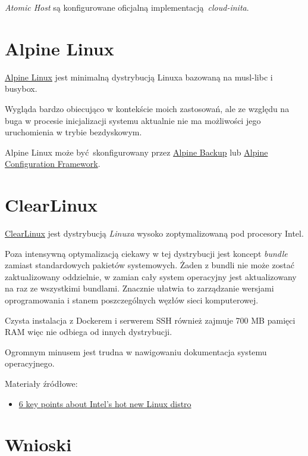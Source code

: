 \documentclass[a4paper,12pt,twoside,openany]{report}
\providecommand{\tightlist}{%
  \setlength{\itemsep}{0pt}\setlength{\parskip}{0pt}}
\begin{document}
\emph{Atomic Host} są konfigurowane oficjalną
implementacją~\emph{cloud-inita}.

\hypertarget{alpine-linux}{%
\section{Alpine Linux}\label{alpine-linux}}

\href{https://alpinelinux.org/}{Alpine Linux} jest minimalną dystrybucją
Linuxa bazowaną na musl-libc i busybox.

Wygląda bardzo obiecująco w kontekście moich zastosowań, ale ze względu
na buga w procesie inicjalizacji systemu aktualnie nie ma możliwości
jego uruchomienia w trybie bezdyskowym.

Alpine Linux może być~skonfigurowany przez
\href{https://wiki.alpinelinux.org/wiki/Alpine_local_backup}{Alpine
Backup} lub
\href{http://wiki.alpinelinux.org/wiki/Alpine_Configuration_Framework_Design}{Alpine
Configuration Framework}.

\hypertarget{clearlinux}{%
\section{ClearLinux}\label{clearlinux}}

\href{https://clearlinux.org/}{ClearLinux} jest dystrybucją
\emph{Linuxa} wysoko zoptymalizowaną pod procesory Intel.

Poza intensywną optymalizacją ciekawy w tej dystrybucji jest koncept
\emph{bundle} zamiast standardowych pakietów systemowych. Żaden z bundli
nie może zostać zaktualizowany oddzielnie, w zamian cały system
operacyjny jest aktualizowany na raz ze wszystkimi bundlami. Znacznie
ułatwia to zarządzanie wersjami oprogramowania i stanem poszczególnych
węzłów sieci komputerowej.

Czysta instalacja z Dockerem i serwerem SSH również zajmuje 700 MB
pamięci RAM więc nie odbiega od innych dystrybucji.

Ogromnym minusem jest trudna w nawigowaniu dokumentacja systemu
operacyjnego.

Materiały źródłowe:

\begin{itemize}
\tightlist
\item
  \href{https://www.infoworld.com/article/3159658/linux/6-key-points-about-intels-hot-new-linux-distro.html}{6
  key points about Intel's hot new Linux distro}
\end{itemize}

\hypertarget{wnioski}{%
\section{Wnioski}\label{wnioski}}
\end{document}
